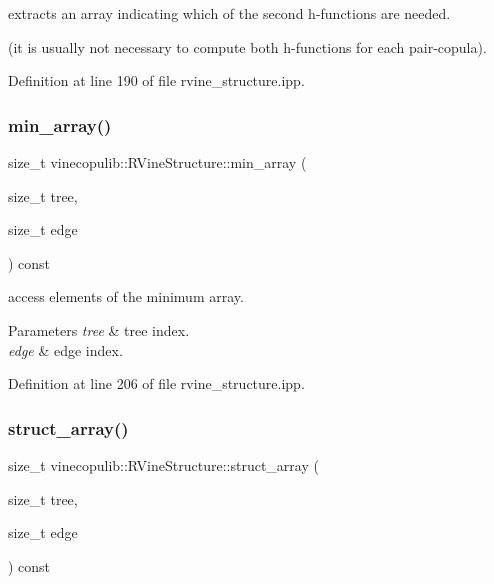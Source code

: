 extracts an array indicating which of the second h-\/functions are needed. 

(it is usually not necessary to compute both h-\/functions for each pair-\/copula). 

Definition at line 190 of file rvine\+\_\+structure.\+ipp.

\mbox{\label{classvinecopulib_1_1_r_vine_structure_a4c67417a03be525c7c64ebcc884b87fc}} 
\subsubsection{\texorpdfstring{min\+\_\+array()}{min\_array()}}
{\footnotesize\ttfamily size\+\_\+t vinecopulib\+::\+R\+Vine\+Structure\+::min\+\_\+array (\begin{DoxyParamCaption}\item[{size\+\_\+t}]{tree,  }\item[{size\+\_\+t}]{edge }\end{DoxyParamCaption}) const\hspace{0.3cm}{\ttfamily [inline]}}



access elements of the minimum array. 


\begin{DoxyParams}{Parameters}
{\em tree} & tree index. \\
\hline
{\em edge} & edge index. \\
\hline
\end{DoxyParams}


Definition at line 206 of file rvine\+\_\+structure.\+ipp.

\mbox{\label{classvinecopulib_1_1_r_vine_structure_a00835cb9e06ca80bfff9c89100a1bb56}} 
\subsubsection{\texorpdfstring{struct\+\_\+array()}{struct\_array()}}
{\footnotesize\ttfamily size\+\_\+t vinecopulib\+::\+R\+Vine\+Structure\+::struct\+\_\+array (\begin{DoxyParamCaption}\item[{size\+\_\+t}]{tree,  }\item[{size\+\_\+t}]{edge }\end{DoxyParamCaption}) const\hspace{0.3cm}{\ttfamily [inline]}}



